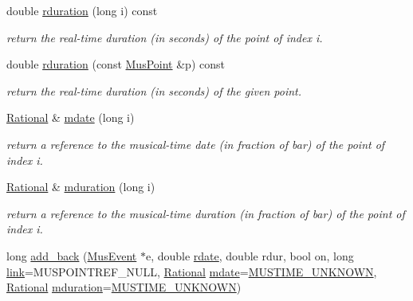 \begin{DoxyCompactItemize}
double \mbox{\hyperlink{group__segment_gafbf05e143d416de49180d2f18a53977b}{rduration}} (long i) const
\begin{DoxyCompactList}\small\item\em return the real-\/time duration (in seconds) of the point of index i. \end{DoxyCompactList}\item 
double \mbox{\hyperlink{group__segment_ga5ce66f635c2ab912e0ec9662c5c2ceaf}{rduration}} (const \mbox{\hyperlink{classMusPoint}{Mus\+Point}} \&p) const
\begin{DoxyCompactList}\small\item\em return the real-\/time duration (in seconds) of the given point. \end{DoxyCompactList}\item 
\mbox{\hyperlink{classRational}{Rational}} \& \mbox{\hyperlink{group__segment_ga6fce03f54fe517cc9541ea446cd26a50}{mdate}} (long i)
\begin{DoxyCompactList}\small\item\em return a reference to the musical-\/time date (in fraction of bar) of the point of index i. \end{DoxyCompactList}\item 
\mbox{\hyperlink{classRational}{Rational}} \& \mbox{\hyperlink{group__segment_ga2c16ef8a681bf9fded1dba29c1a84342}{mduration}} (long i)
\begin{DoxyCompactList}\small\item\em return a reference to the musical-\/time duration (in fraction of bar) of the point of index i. \end{DoxyCompactList}\item 
long \mbox{\hyperlink{group__segment_gabb6224ab371e84d2048f3c9e2692d15d}{add\+\_\+back}} (\mbox{\hyperlink{classMusEvent}{Mus\+Event}} $\ast$e, double \mbox{\hyperlink{group__segment_ga7c26187b3e70ea62bd10b9b15284a99a}{rdate}}, double rdur, bool on, long \mbox{\hyperlink{group__segment_ga43310a16681e2241b20da4b68de9f35b}{link}}=M\+U\+S\+P\+O\+I\+N\+T\+R\+E\+F\+\_\+\+N\+U\+LL, \mbox{\hyperlink{classRational}{Rational}} \mbox{\hyperlink{group__segment_ga6fce03f54fe517cc9541ea446cd26a50}{mdate}}=\mbox{\hyperlink{group__general_gae862a9d955eb3154601efb64980ac24b}{M\+U\+S\+T\+I\+M\+E\+\_\+\+U\+N\+K\+N\+O\+WN}}, \mbox{\hyperlink{classRational}{Rational}} \mbox{\hyperlink{classInputSegment_aa5410aeef3d5c6a263424b252eb78511}{mduration}}=\mbox{\hyperlink{group__general_gae862a9d955eb3154601efb64980ac24b}{M\+U\+S\+T\+I\+M\+E\+\_\+\+U\+N\+K\+N\+O\+WN}})

\end{DoxyCompactItemize}

